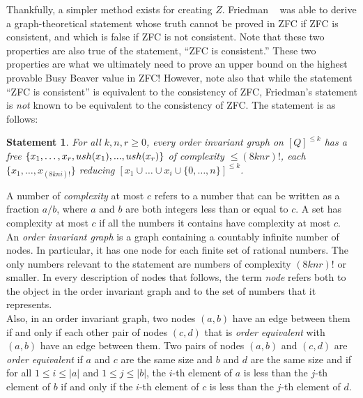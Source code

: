 \documentclass[11pt]{report}
\newtheorem{statement}{Statement}
\begin{document}
Thankfully, a simpler method exists for creating $Z$. Friedman \cite{friedman}~
was able to derive a graph-theoretical statement whose truth cannot be proved in ZFC if ZFC is consistent, and which is false if ZFC is not consistent. Note that these two properties are also true of the statement, ``ZFC is consistent.'' These two properties are what we ultimately need to prove an upper bound on the highest provable Busy Beaver value in ZFC! However, note also that while the statement ``ZFC is consistent'' is equivalent to the consistency of ZFC, Friedman's statement is \emph{not} known to be equivalent to the consistency of ZFC. The statement is as follows: \\

\begin{statement} \label{eq:friedman}
For all $k, n, r \ge 0$, every order invariant graph on $[Q]^{\le k}$ has a free $\{x_1,\dots,x_r, \\
ush(x_1),...,ush(x_r)\}$ of complexity $\le (8knr)!$, each $\{x_1, \dots, x_{(8kni)!}\}$
reducing $[x_1 \cup \dots \cup x_i \cup \{0,\dots,n\}]^{\le k}$. \cite{friedman}
\end{statement}

A number of \emph{complexity} at most $c$ refers to a number that can be written as a fraction $a/b$, where $a$ and $b$ are both integers less than or equal to $c$. A set has complexity at most $c$ if all the numbers it contains have complexity at most $c$. \\ 

An \emph{order invariant graph} is a graph containing a countably infinite number of nodes. In particular, it has one node for each finite set of rational numbers. The only numbers relevant to the statement are numbers of complexity $(8knr)!$ or smaller. In every description of nodes that follows, the term \emph{node} refers both to the object in the order invariant graph and to the set of numbers that it represents. \\

Also, in an order invariant graph, two nodes $(a,b)$ have an edge between them if and only if each other pair of nodes $(c,d)$ that is \emph{order equivalent} with $(a,b)$ have an edge between them. Two pairs of nodes $(a, b)$ and $(c, d)$ are \emph{order equivalent} if $a$ and $c$ are the same size and $b$ and $d$ are the same size and if for all $1 \le i \le |a|$ and $1 \le j \le |b|$, the $i$-th element of $a$ is less than the $j$-th element of $b$ if and only if the $i$-th element of $c$ is less than the $j$-th element of $d$. \\
\end{document}
